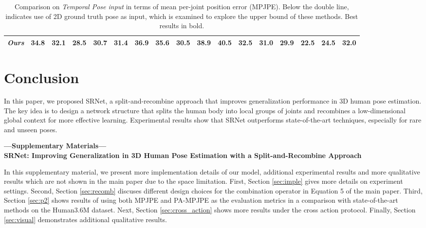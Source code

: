 \documentclass[runningheads]{llncs}
\begin{document}
\begin{table*}
\begin{center}
{\begin{tabular}{ l c c c c c c c c c c c c c c c c }
\emph{Ours}  &\textbf{34.8} & \textbf{32.1} & \textbf{28.5} &\textbf{30.7} & \textbf{31.4} & \textbf{36.9} & \textbf{35.6} & \textbf{30.5} &\textbf{38.9} &\textbf{40.5} &\textbf{32.5} &\textbf{31.0} & \textbf{29.9}&\textbf{22.5}&\textbf{24.5}&\textbf{32.0}\\
\hline
\end{tabular}}
\end{center}
\caption{Comparison on \emph{Temporal Pose input} in terms of mean per-joint position error (MPJPE). Below the double line,  indicates use of 2D ground truth pose as input, which is examined to explore the upper bound of these methods. Best results in bold. }
\label{tab:human_p1_t}
\end{table*}

\section{Conclusion}
\label{sec:conclusion}
In this paper, we proposed SRNet, a split-and-recombine approach that improves generalization performance in 3D human pose estimation. The key idea is to design a network structure that splits the human body into local groups of joints and recombines a low-dimensional global context for more effective learning. Experimental results show that SRNet outperforms state-of-the-art techniques, especially for rare and unseen poses. 



\clearpage



\pagebreak
\begin{center}
\textbf{\large ---Supplementary Materials---\\ SRNet: Improving Generalization in 3D Human Pose Estimation with a Split-and-Recombine Approach}
\end{center}
\setcounter{equation}{0}
\setcounter{figure}{0}
\setcounter{table}{0}
\setcounter{section}{0}
\setcounter{page}{0}



In this supplementary material, we present more implementation details of our model, additional experimental results and more qualitative results which are not shown in the main paper due to the space limitation. First, Section \ref{sec:imple} gives more details on experiment settings. Second, Section \ref{sec:recomb} discuses different design choices for the combination operator  in Equation 5 of the main paper. Third, Section \ref{sec:p2} shows results of using both MPJPE and PA-MPJPE
as the evaluation metrics in a comparison with state-of-the-art methods on the Human3.6M dataset. Next, Section \ref{sec:cross_action} shows more results under the cross action protocol. Finally, Section \ref{sec:visual} demonstrates additional qualitative results.
\end{document}
